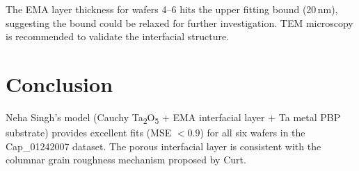 \documentclass[11pt]{article}
\begin{document}
The EMA layer thickness for wafers 4--6 hits the upper fitting bound (20\,nm),
suggesting the bound could be relaxed for further investigation. TEM microscopy
is recommended to validate the interfacial structure.

\section{Conclusion}

Neha Singh's model (Cauchy Ta\textsubscript{2}O\textsubscript{5} + EMA interfacial layer
+ Ta metal PBP substrate) provides excellent fits (MSE $< 0.9$) for all six wafers in
the Cap\_01242007 dataset. The porous interfacial layer is consistent with the columnar
grain roughness mechanism proposed by Curt.
\end{document}

